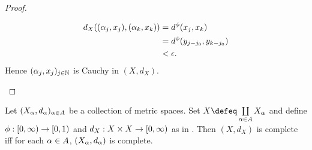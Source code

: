 \documentclass{book}
\begin{document}
\begin{proof}
\begin{itemize}
		\begin{align*}
			d_X((\alpha_j, x_j), (\alpha_k, x_k))
			& = d^{\phi}(x_j, x_k) \\
			& = d^{\phi}(y_{j- j_0}, y_{k-j_0}) \\
			& < \epsilon. 
		\end{align*} 
		Hence $(\alpha_j, x_j)_{j \in \mathbb{N}}$ is Cauchy in $(X, d_X)$. 
	\end{itemize}
\end{proof}

\begin{ex} 
	Let $(X_{\alpha}, d_{\alpha})_{\alpha \in A}$ be a collection of metric spaces. Set $X \defeq \coprod\limits_{\al \in A} X_{\al}$ and define $\phi:[0,\infty) \rightarrow [0,1)$ and $d_X: X \times X \rightarrow [0,\infty)$ as in . Then $(X, d_X)$ is complete iff for each $\alpha \in A$, $(X_{\alpha}, d_{\alpha})$ is complete.
\end{ex}
\end{document}

